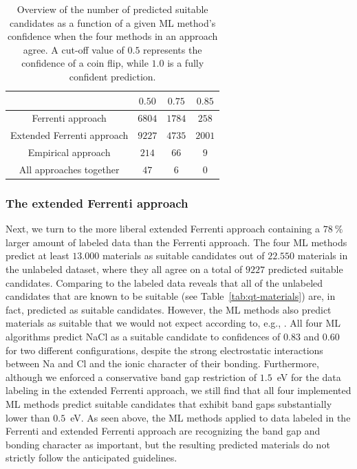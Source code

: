 \documentclass[superscriptaddress,unsortedaddress,
 amsmath,amssymb,
 aps,
]{revtex4-2}
\begin{document}
\begin{table}[t]
    \centering 
    \caption{Overview of the number of predicted suitable candidates as a function of a given ML method's confidence when the four methods in an approach agree. A cut-off value of $0.5$ represents the confidence of a coin flip, while $1.0$ is a fully confident prediction.}
    \begin{tabular}{c|c|c|c}
      & $0.50$ & $0.75$ & $0.85$ \\
     \hline
     Ferrenti approach &  $6804$ & $1784$ & $258$  \\
     Extended Ferrenti approach &  $9227$ & $4735$  & $2001$  \\ 
     Empirical approach & $214$ & $66$ & $9$ \\
     \hline
     All approaches together & $47$ & $6$ & 0 \\
    \end{tabular}
    \label{tab:probabilites}
\end{table} 


\subsubsection*{The extended Ferrenti approach}
Next, we turn to the more liberal extended Ferrenti approach containing a $78 \ \%$ larger 
amount of labeled data than the Ferrenti approach.  
The four ML methods predict at least $13.000$ materials as suitable candidates out of $22.550$ materials in the unlabeled dataset, where they all agree on a total of $9227$ predicted suitable candidates. Comparing to the labeled data reveals that all of the unlabeled candidates that are known to be suitable (see Table~\ref{tab:qt-materials}) are, in fact, predicted as suitable candidates. 
However, the ML methods also predict materials as suitable that we would not expect according to, e.g., \citeauthor{Weber2010} \cite{Weber2010}. 
All four ML algorithms predict NaCl as a suitable candidate to confidences of $0.83$ and $0.60$ for two different configurations, despite the strong electrostatic interactions between Na and Cl and the ionic character of their bonding.  
Furthermore, although we enforced a conservative band gap restriction of $1.5$~eV for the data labeling in the extended Ferrenti approach, we still find that all four implemented ML methods predict suitable candidates that exhibit band gaps substantially lower than $0.5$~eV.  
As seen above, the ML methods applied to data labeled in the Ferrenti and extended Ferrenti approach are recognizing the band gap and bonding character as important, but the resulting predicted materials do not strictly follow the anticipated guidelines. 
 
\end{document}
